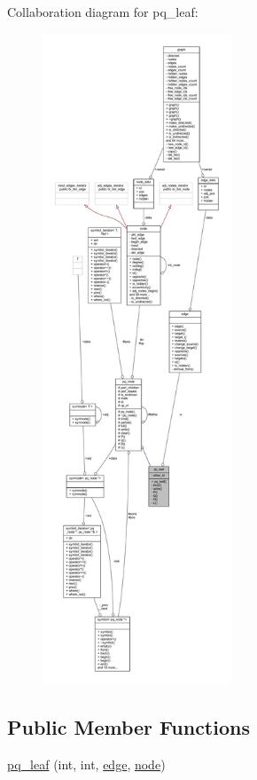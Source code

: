 Collaboration diagram for pq\+\_\+leaf\+:\nopagebreak
\begin{figure}[H]
\begin{center}
\leavevmode
\includegraphics[height=550pt]{classpq__leaf__coll__graph}
\end{center}
\end{figure}
\subsection*{Public Member Functions}
\begin{DoxyCompactItemize}
\item 
\mbox{\hyperlink{classpq__leaf_a5478f8f28b4661ec404c492a01ac1f34}{pq\+\_\+leaf}} (int, int, \mbox{\hyperlink{classedge}{edge}}, \mbox{\hyperlink{classnode}{node}})
\end{DoxyCompactItemize}
